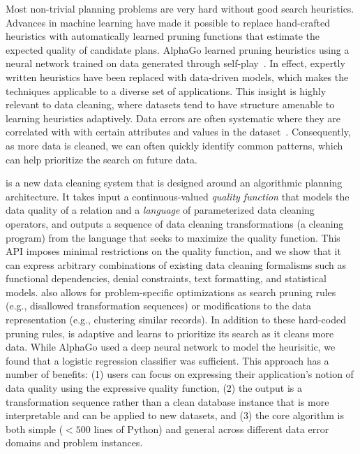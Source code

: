 Most non-trivial planning problems are very hard without good search heuristics.
Advances in machine learning have made it possible to replace hand-crafted heuristics with automatically learned pruning functions that estimate the expected quality of candidate plans. AlphaGo learned pruning heuristics using a neural network trained on data generated through self-play~\cite{silver2016mastering}. 
In effect, expertly written heuristics have been replaced with data-driven models, which makes the techniques applicable to a diverse set of applications.   
This insight is highly relevant to data cleaning, where datasets tend to have structure amenable to learning heuristics adaptively.
Data errors are often systematic where they are correlated with with certain attributes and values in the dataset~\cite{rekatsinas2017holoclean,DBLP:journals/pvldb/KrishnanWWFG16}.
Consequently, as more data is cleaned, we can often quickly identify common patterns, which can help prioritize the search on future data.

\sys is a new data cleaning system that is designed around an algorithmic planning architecture. It takes input a continuous-valued {\it quality function} that models the data quality of a relation and a {\it language} of parameterized data cleaning operators, and outputs a sequence of data cleaning transformations (a cleaning program) from the language that seeks to maximize the quality function.  This API imposes minimal restrictions on the quality function, and we show that it can express arbitrary combinations of existing data cleaning formalisms such as functional dependencies, denial constraints, text formatting, and statistical models.  
\sys also allows for problem-specific optimizations as search pruning rules (e.g., disallowed transformation sequences) or modifications to the data representation (e.g., clustering similar records).  
In addition to these hard-coded pruning rules, \sys is adaptive and learns to prioritize its search as it cleans more data.
While AlphaGo used a deep neural network to model the heurisitic, we found that a logistic regression classifier was sufficient. 
This approach has a number of benefits: (1) users can focus on expressing their application's notion of data quality using the expressive quality function, (2) the output is a transformation sequence rather than a clean database instance that is more interpretable and can be applied to new datasets, and (3) the core algorithm is both simple  ($<500$ lines of Python) and general across different data error domains and problem instances.

